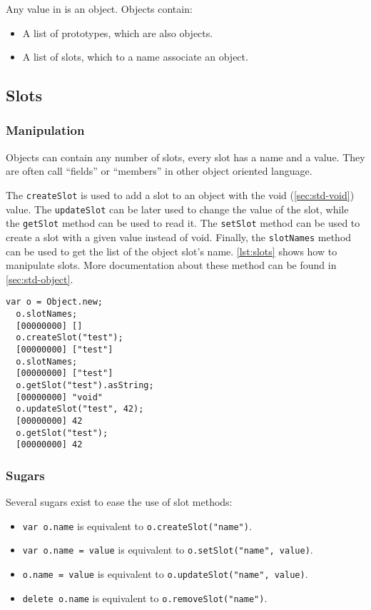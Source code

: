 \documentclass[openright,twoside,12pt]{report}
\begin{document}
Any value in \us is an object. Objects contain:

\begin{itemize}
\item A list of prototypes, which are also objects.
\item A list of slots, which to a name associate an object.
\end{itemize}

\subsection{Slots}

\subsubsection{Manipulation}

Objects can contain any number of slots, every slot has a name and a
value. They are often call ``fields'' or ``members'' in other object
oriented language.

The \lstinline|createSlot| is used to add a slot to an object with the
void (\autoref{sec:std-void}) value. The \lstinline|updateSlot| can be later
used to change the value of the slot, while the \lstinline|getSlot|
method can be used to read it. The \lstinline|setSlot| method can be
used to create a slot with a given value instead of void. Finally, the
\lstinline|slotNames| method can be used to get the list of the object
slot's name. \autoref{lst:slots} shows how to manipulate slots. More
documentation about these method can be found in \autoref{sec:std-object}.

\begin{lstlisting}[caption=Manipulating slots, label=lst:slots,
  float=\floatpos]
  var o = Object.new;
  o.slotNames;
  [00000000] []
  o.createSlot("test");
  [00000000] ["test"]
  o.slotNames;
  [00000000] ["test"]
  o.getSlot("test").asString;
  [00000000] "void"
  o.updateSlot("test", 42);
  [00000000] 42
  o.getSlot("test");
  [00000000] 42
\end{lstlisting}

\subsubsection{Sugars}

Several sugars exist to ease the use of slot methods:

\begin{itemize}
\item \lstinline|var o.name| is equivalent to
  \lstinline|o.createSlot("name")|.
\item \lstinline|var o.name = value| is equivalent to
  \lstinline|o.setSlot("name", value)|.
\item \lstinline|o.name = value| is equivalent to
  \lstinline|o.updateSlot("name", value)|.
\item \lstinline|delete o.name| is equivalent to
  \lstinline|o.removeSlot("name")|.
\end{itemize}
\end{document}
